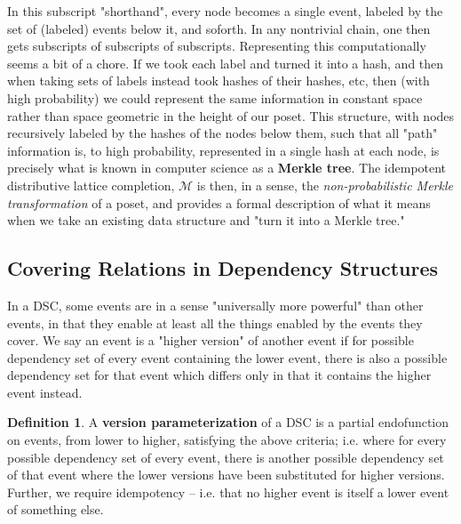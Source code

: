 \documentclass[hoptionsi,review,format=sigplan]{acmart}
\theoremstyle{definition}
\newtheorem{definition}{Definition}[section]
\newcommand{\Mcc}{\mathcal{M}}
\begin{document}
In this subscript "shorthand", every node becomes a single event, labeled by the set of (labeled) events below it, and soforth. In any nontrivial chain, one then gets subscripts of subscripts of subscripts. Representing this computationally seems a bit of a chore. If we took each label and turned it into a hash, and then when taking sets of labels instead took hashes of their hashes, etc, then (with high probability) we could represent the same information in constant space rather than space geometric in the height of our poset. This structure, with nodes recursively labeled by the hashes of the nodes below them, such that all "path" information is, to high probability, represented in a single hash at each node, is precisely what is known in computer science as a \textbf{Merkle tree}. The idempotent distributive lattice completion, \(\Mcc\) is then, in a sense, the \textit{non-probabilistic Merkle transformation} of a poset, and provides a formal description of what it means when we take an existing data structure and "turn it into a Merkle tree."




\subsection{Covering Relations in Dependency Structures}

In a DSC, some events are in a sense "universally more powerful" than other events, in that they enable at least all the things enabled by the events they cover. We say an event is a "higher version" of another event if for possible dependency set of every event containing the lower event, there is also a possible dependency set for that event which differs only in that it contains the higher event instead. 

\begin{definition}
A \textbf{version parameterization} of a DSC is a partial endofunction on events, from lower to higher, satisfying the above criteria; i.e. where for every possible dependency set of every event, there is another possible dependency set of that event where the lower versions have been substituted for higher versions. Further, we require idempotency -- i.e. that no higher event is itself a lower event of something else.
\end{definition}
\end{document}

